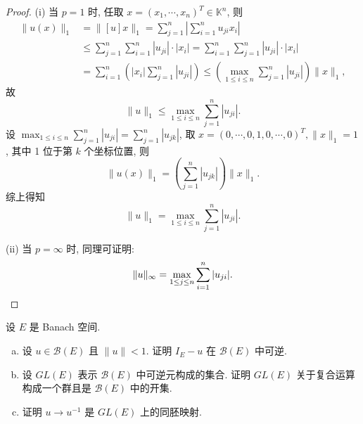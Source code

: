 \begin{proof}
(i) 当 $p=1$ 时, 任取 $x=(x_1,\cdots,x_n)^T\in\mathbb{K}^n$, 则
\[\begin{split}\|u(x)\|_1
&=\|[u]x\|_1=\sum_{j=1}^n\left|\sum_{i=1}^nu_{ji}x_i\right|\\
&\leq \sum_{j=1}^n\sum_{i=1}^n|u_{ji}|\cdot|x_i|=\sum_{i=1}^n\sum_{j=1}^n|u_{ji}|\cdot|x_i|\\
&=\sum_{i=1}^n\left(|x_i|\sum_{j=1}^n|u_{ji}|\right)\leq\left(\max\limits_{1\leq i\leq n}\sum_{j=1}^n|u_{ji}|\right)\|x\|_1,
\end{split}\]
故
\[\|u\|_1\leq \max\limits_{1\leq i\leq n}\sum_{j=1}^n|u_{ji}|.\]
设 $\max_{1\leq i\leq n}\sum_{j=1}^n|u_{ji}|=\sum_{j=1}^n|u_{jk}|$, 
取 $x=(0,\cdots,0,1,0,\cdots,0)^T,\|x\|_1=1$, 其中 1 位于第 $k$ 个坐标位置, 则
\[\|u(x)\|_1=\left(\sum_{j=1}^n|u_{jk}|\right)\|x\|_1.\]
综上得知
\[\|u\|_1=\max\limits_{1\leq i\leq n}\sum_{j=1}^n|u_{ji}|.\]

(ii) 当 $p=\infty$ 时, 同理可证明:
\[\|u\|_{\infty}=\max\limits_{1\leq j\leq n}\sum_{i=1}^n|u_{ji}|.\qedhere\]
\end{proof}


\begin{exercise}
    设 $E$ 是 Banach 空间.
    \begin{enumerate}[(a)]
    \item 设 $u\in\mathcal{B}(E)$ 且 $\|u\|<1$. 证明 $I_E-u$ 在 $\mathcal{B}(E)$ 中可逆.
    \item 设 $GL(E)$ 表示 $\mathcal{B}(E)$ 中可逆元构成的集合.
      证明 $GL(E)$ 关于复合运算构成一个群且是 $\mathcal{B}(E)$ 中的开集.
    \item 证明 $u\to u^{-1}$ 是 $GL(E)$ 上的同胚映射.
    \end{enumerate}
\end{exercise}

